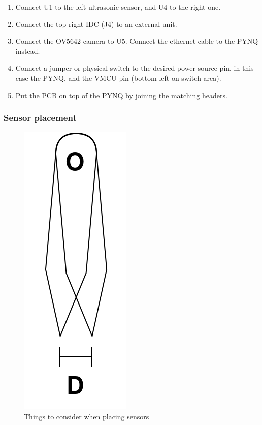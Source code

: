 \begin{enumerate}
    \item Connect U1 to the left ultrasonic sensor, and U4 to the right one. 
    \item Connect the top right IDC (J4) to an external unit. 
    \item \sout{Connect the OV5642 camera to U5.} Connect the ethernet cable to the PYNQ instead. 
    \item Connect a jumper or physical switch to the desired power source pin, in this case the PYNQ, and the VMCU pin (bottom left on  switch area).
    \item Put the PCB on top of the PYNQ by joining the matching headers.
\end{enumerate}

\clearpage

\subsubsection{Sensor placement}

\begin{figure}
    \centering
    \includegraphics[scale=0.25]{Images/Ultra_Distance.png}
    \caption{Things to consider when placing sensors}
    \label{fig:ultra_dist}
\end{figure}

